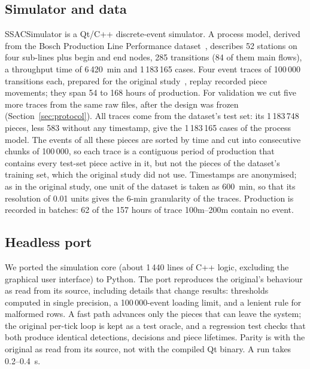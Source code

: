 \documentclass[preprint,11pt]{elsarticle}
\begin{document}
\subsection{Simulator and data}
SSACSimulator is a Qt/C++ discrete-event simulator. A process model, derived from the Bosch Production Line Performance dataset~\cite{bosch2016kaggle}, describes 52 stations on four sub-lines plus begin and end nodes, 285 transitions (84 of them main flows), a throughput time of 6\,420~min and 1\,183\,165 cases. Four event traces of 100\,000 transitions each, prepared for the original study~\cite{sanchez2020selfstar}, replay recorded piece movements; they span 54 to 168 hours of production. For validation we cut five more traces from the same raw files, after the design was frozen (Section~\ref{sec:protocol}). All traces come from the dataset's test set: its 1\,183\,748 pieces, less 583 without any timestamp, give the 1\,183\,165 cases of the process model. The events of all these pieces are sorted by time and cut into consecutive chunks of 100\,000, so each trace is a contiguous period of production that contains every test-set piece active in it, but not the pieces of the dataset's training set, which the original study did not use. Timestamps are anonymised; as in the original study, one unit of the dataset is taken as 600~min, so that its resolution of 0.01 units gives the 6-min granularity of the traces. Production is recorded in batches: 62 of the 157 hours of trace 100m--200m contain no event.

\subsection{Headless port}
We ported the simulation core (about 1\,440 lines of C++ logic, excluding the graphical user interface) to Python. The port reproduces the original's behaviour as read from its source, including details that change results: thresholds computed in single precision, a 100\,000-event loading limit, and a lenient rule for malformed rows. A fast path advances only the pieces that can leave the system; the original per-tick loop is kept as a test oracle, and a regression test checks that both produce identical detections, decisions and piece lifetimes. Parity is with the original as read from its source, not with the compiled Qt binary. A run takes 0.2--0.4~s.
\end{document}
